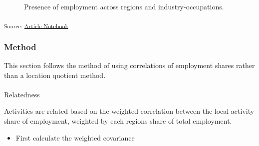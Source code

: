 \documentclass[
  number]{elsarticle}
\makeatletter
\let\oldparagraph\paragraph
\renewcommand{\paragraph}{
    \@ifstar
      \xxxParagraphStar
      \xxxParagraphNoStar
  }
\newcommand{\xxxParagraphStar}[1]{\oldparagraph*{#1}\mbox{}}
\newcommand{\xxxParagraphNoStar}[1]{\oldparagraph{#1}\mbox{}}
\providecommand{\tightlist}{%
  \setlength{\itemsep}{0pt}\setlength{\parskip}{0pt}}\usepackage{longtable,booktabs,array}
\makeatother
\begin{document}
\label{cell-fig-employment-density}
\begin{figure}[H]


\caption{\label{fig-employment-density}Presence of employment across
regions and industry-occupations.}

\end{figure}%

\textsubscript{Source:
\href{https://aiti-flinders.github.io/sirp-complexity/index.qmd.html}{Article
Notebook}}

\subsubsection{Method}\label{method}

This section follows the method of \citep{ecnz} using correlations of
employment shares rather than a location quotient method.

\paragraph{Relatedness}\label{relatedness}

Activities are related based on the weighted correlation between the
local activity share of employment, weighted by each regions share of
total employment.

\begin{itemize}
\tightlist
\item
  First calculate the weighted covariance
\end{itemize}
\end{document}
